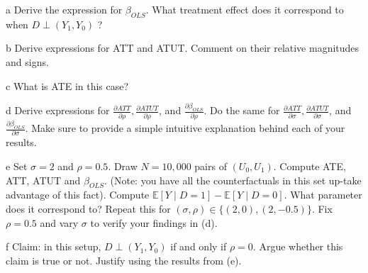 \documentclass{article}
\begin{document}
\begin{problem}{a}
Derive the expression for $\beta_{O L S}$. What treatment effect does it correspond to when $D \perp\left(Y_{1}, Y_{0}\right)$ ?
\end{problem}
\begin{solution}

\end{solution}
\begin{problem}{b}
Derive expressions for ATT and ATUT. Comment on their relative magnitudes and signs.
\end{problem}
\begin{solution}

\end{solution}
\begin{problem}{c}
What is ATE in this case?
\end{problem}
\begin{solution}

\end{solution}
\begin{problem}{d}
Derive expressions for $\frac{\partial A T T}{\partial \rho}, \frac{\partial A T U T}{\partial \rho}$, and $\frac{\partial \beta_{O L S}}{\partial \rho}$. Do the same for $\frac{\partial A T T}{\partial \sigma}, \frac{\partial A T U T}{\partial \sigma}$, and $\frac{\partial \beta_{O L S}}{\partial \sigma}$. Make sure to provide a simple intuitive explanation behind each of your results.
\end{problem}
\begin{solution}

\end{solution}
\begin{problem}{e}
Set $\sigma=2$ and $\rho=0.5$. Draw $N=10,000$ pairs of $\left(U_{0}, U_{1}\right)$. Compute ATE, ATT, ATUT and $\beta_{O L S}$. (Note: you have all the counterfactuals in this set up-take advantage of this fact). Compute $\mathbb{E}[Y \mid D=1]-\mathbb{E}[Y \mid D=0]$. What parameter does it correspond to? Repeat this for $(\sigma, \rho) \in\{(2,0),(2,-0.5)\}$. Fix $\rho=0.5$ and vary $\sigma$ to verify your findings in (d).
\end{problem}
\begin{solution}

\end{solution}
\begin{problem}{f}
Claim: in this setup, $D \perp\left(Y_{1}, Y_{0}\right)$ if and only if $\rho=0$. Argue whether this claim is true or not. Justify using the results from (e).
\end{problem}
\begin{solution}

\end{solution}
\end{document}
